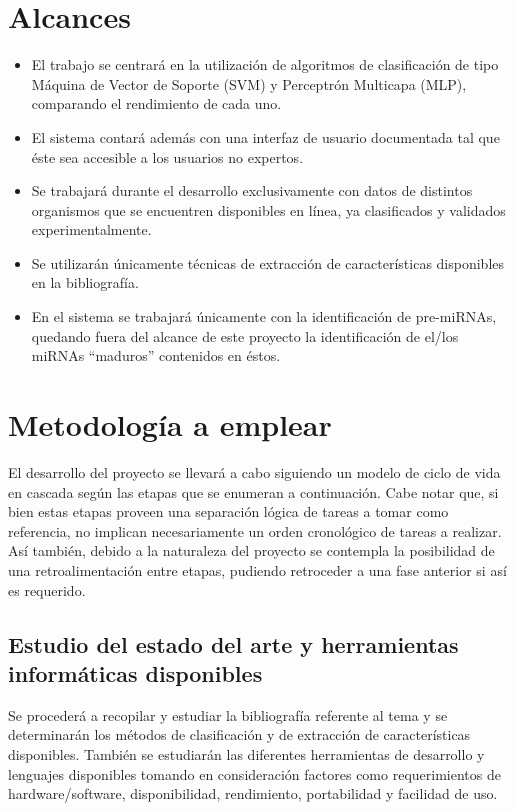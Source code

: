\documentclass[12pt,bibliography=oldstyle,DIV=12,parskip=full-,titlepage]{scrartcl}
\begin{document}
\section{Alcances}
\begin{itemize}
\item El trabajo se centrará en la utilización de algoritmos de
  clasificación de tipo Máquina de Vector de Soporte (SVM) y
  Perceptrón Multicapa (MLP), comparando el rendimiento de cada uno.
\item El sistema contará además con una interfaz de usuario
  documentada tal que éste sea accesible a los usuarios no expertos.
\item Se trabajará durante el desarrollo exclusivamente con datos de
  distintos organismos que se encuentren disponibles en línea, ya
  clasificados y validados experimentalmente.
\item Se utilizarán únicamente técnicas de extracción de
  características disponibles en la bibliografía.
\item En el sistema se trabajará únicamente con la identificación de
  pre-miRNAs, quedando fuera del alcance de este proyecto la
  identificación de el/los miRNAs ``maduros'' contenidos en éstos.
\end{itemize}
%
%
\newpage
\section{Metodología a emplear}
El desarrollo del proyecto se llevará a cabo siguiendo un modelo de
ciclo de vida en cascada según las etapas que se enumeran a
continuación.  Cabe notar que, si bien estas etapas proveen una
separación lógica de tareas a tomar como referencia, no implican
necesariamente un orden cronológico de tareas a realizar. Así también,
debido a la naturaleza del proyecto se contempla la posibilidad de una
retroalimentación entre etapas, pudiendo retroceder a una fase
anterior si así es requerido.
%
\subsection{Estudio del estado del arte y herramientas informáticas
  disponibles}
Se procederá a recopilar y estudiar la bibliografía referente al tema
y se determinarán los métodos de clasificación y de extracción de
características disponibles. También se estudiarán las diferentes
herramientas de desarrollo y lenguajes disponibles tomando en
consideración factores como requerimientos de hardware/software,
disponibilidad, rendimiento, portabilidad y facilidad de uso.
%
\end{document}
